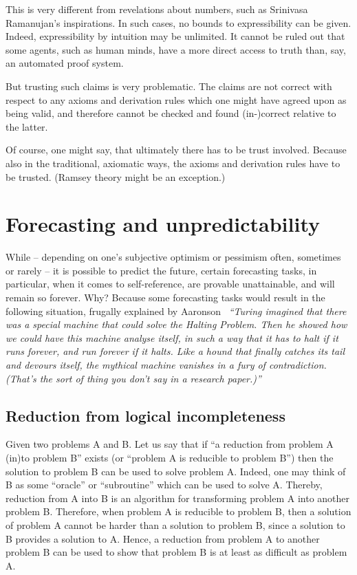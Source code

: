 This is very different from revelations about numbers, such as Srinivasa Ramanujan's inspirations.
In such cases, no bounds to expressibility can be given.
Indeed, expressibility by intuition may be unlimited.
It cannot be ruled out that some agents, such as human minds, have a more direct access to truth than, say, an automated proof system.

But trusting such claims is very problematic.
The claims are not correct with respect to any axioms and derivation rules which one might have agreed upon as being valid,
and therefore cannot be checked and found (in-)correct relative to the latter.

Of course, one might say, that ultimately there has to be trust involved.
Because also in the traditional, axiomatic ways, the axioms and derivation rules have to be trusted.
(Ramsey theory might be an exception.)




\chapter{Forecasting and unpredictability}
\label{2016-pu-book-chapter-up}

While -- depending on one's subjective optimism or pessimism often, sometimes or rarely -- it is possible to predict the future,
certain forecasting tasks, in particular, when it comes to self-reference, are provable unattainable, and will remain so forever.
Why? Because some forecasting tasks would result in the following situation, frugally explained by
Aaronson~\cite{aaronson-blog}
{\em ``Turing imagined that there was a special machine that could solve the Halting Problem.
Then he showed how we could have this machine analyse itself,
in such a way that it has to halt if it runs forever, and run forever if it halts.
Like a hound that finally catches its tail and devours itself, the mythical machine vanishes in a fury of contradiction.
(That's the sort of thing you don't say in a research paper.)''}

\section{Reduction from logical incompleteness}
\label{2016-pu-book-chapter-up-red}

Given two problems A and B. Let us say that if ``a reduction from problem A (in)to problem B'' exists
(or ``problem A is reducible to problem B'')  then the
solution to problem B can be used to solve problem A. Indeed,
one may think of B as some ``oracle'' or ``subroutine''
which can be used to solve A.
Thereby, reduction from A into B is an algorithm for transforming problem A into another problem B.
Therefore, when problem A is reducible to problem B, then a solution of problem A cannot be
harder than a solution to problem B, since a solution to B
provides a solution to A.
Hence, a reduction from  problem A to another problem B
can be used to show that problem B is at least as difficult as problem A.


